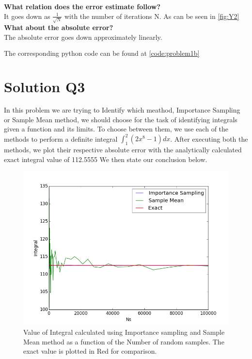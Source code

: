 \documentclass[a4paper,11pt]{article}
\begin{document}
\textbf{What relation does the error estimate follow?}
\\It goes down as $\frac{1}{\sqrt{N}}$ with the number of iterations N. As can be seen in \ref{fig:Y2}
\\\textbf{What about the absolute error?}
\\The absolute error goes down approximately linearly.


The corresponding python code can be found at \ref{code:problem1b}
\clearpage
\section{Solution Q3}\label{prob3}
In this problem we are trying to Identify which meathod, Importance Sampling or Sample Mean method, we should choose for the task of identifying integrals given a function and its limits. To choose between them, we use each of the methods to perform a definite integral $\int_{1}^{2} (2x^{8}-1) dx$. After executing both the methods, we plot their respective absolute error with the analytically calculated exact integral value of 112.5555 We then state our conclusion below. 
\begin{figure}[ht]
	\centering
    \includegraphics[scale=0.80]{Integrals.png}
    \caption{Value of Integral calculated using Importance sampling and Sample Mean method as a function of the Number of random samples. The exact value is plotted in Red for comparison.}
	\label{fig:errors}
\end{figure}
\end{document}
